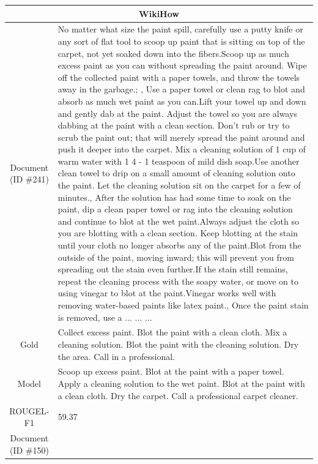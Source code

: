 \begin{table}[bth!]
\scriptsize
\centering
\renewcommand{\arraystretch}{1.3}
\begin{tabular}{c|p{}}
\hline
\multicolumn{2}{c}{WikiHow} \\ \hline
\makecell{Document\\(ID \#241)} & 
No matter what size the paint spill, carefully use a putty knife or any sort of flat tool to scoop up paint that is sitting on top of the carpet, not yet soaked down into the fibers.Scoop up as much excess paint as you can without spreading the paint around. Wipe off the collected paint with a paper towels, and throw the towels away in the garbage.; , Use a paper towel or clean rag to blot and absorb as much wet paint as you can.Lift your towel up and down and gently dab at the paint. Adjust the towel so you are always dabbing at the paint with a clean section. Don’t rub or try to scrub the paint out; that will merely spread the paint around and push it deeper into the carpet. Mix a cleaning solution of 1 cup of warm water with 1  4 - 1 teaspoon of mild dish soap.Use another clean towel to drip on a small amount of cleaning solution onto the paint. Let the cleaning solution sit on the carpet for a few of minutes., After the solution has had some time to soak on the paint, dip a clean paper towel or rag into the cleaning solution and continue to blot at the wet paint.Always adjust the cloth so you are blotting with a clean section. Keep blotting at the stain until your cloth no longer absorbs any of the paint.Blot from the outside of the paint, moving inward; this will prevent you from spreading out the stain even further.If the stain still remains, repeat the cleaning process with the soapy water, or move on to using vinegar to blot at the paint.Vinegar works well with removing water-based paints like latex paint., Once the paint stain is removed, use a ... ... ... 
\\ \hline
Gold & 
Collect excess paint. Blot the paint with a clean cloth. Mix a cleaning solution. Blot the paint with the cleaning solution. Dry the area. Call in a professional.
\\ \hline
Model & 
Scoop up excess paint. Blot at the paint with a paper towel. Apply a cleaning solution to the wet paint. Blot at the paint with a clean cloth. Dry the carpet. Call a professional carpet cleaner.
\\ \hline
ROUGEL-F1 & 
59.37
\\ \hline
\makecell{Document\\(ID \#150)} & 

\end{tabular}
\end{table}
